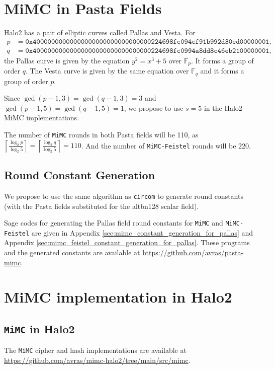 \documentclass[10pt]{article}
\begin{document}
\section{MiMC in Pasta Fields}%
\label{sec:mimc_in_halo2}
Halo2 has a pair of elliptic curves called Pallas and Vesta. For
\begin{align*}
  p & = \texttt{0x40000000000000000000000000000000224698fc094cf91b992d30ed00000001},\\
  q & = \texttt{0x40000000000000000000000000000000224698fc0994a8dd8c46eb2100000001},
\end{align*}
the Pallas curve is given by the equation $y^2 = x^3+5$ over $\mathbb{F}_p$. It forms a group of order $q$. The Vesta curve is given by the same equation over $\mathbb{F}_q$ and it forms a group of order $p$.

Since $\gcd(p-1, 3) = \gcd(q-1, 3) = 3$ and $\gcd(p-1, 5)=\gcd(q-1, 5)=1$, we propose to use $s=5$ in the Halo2 MiMC implementations.

The number of \texttt{MiMC} rounds in both Pasta fields will be 110, as $\left\lceil \frac{\log_2 p}{\log_2 5} \right\rceil = \left\lceil \frac{\log_2 q}{\log_2 5} \right\rceil = 110$. And the number of \texttt{MiMC-Feistel} rounds will be 220.
\subsection{Round Constant Generation}%
\label{subsec:round_constant_generation}
We propose to use the same algorithm as \texttt{circom} to generate round constants (with the Pasta fields substituted for the alt\textunderscore bn128 scalar field).

Sage codes for generating the Pallas field round constants for \texttt{MiMC} and \texttt{MiMC-Feistel} are given in Appendix \ref{sec:mimc_constant_generation_for_pallas} and Appendix \ref{sec:mimc_feistel_constant_generation_for_pallas}. These programs and the generated constants are available at \url{https://github.com/avras/pasta-mimc}.

\section{MiMC implementation in Halo2}%
\label{sec:mimc_implementation_in_halo2}

\subsection{\texttt{MiMC} in Halo2}%
\label{subsec:mimc_in_halo2}
The \texttt{MiMC} cipher and hash implementations are available at \url{https://github.com/avras/mimc-halo2/tree/main/src/mimc}. 
\end{document}
